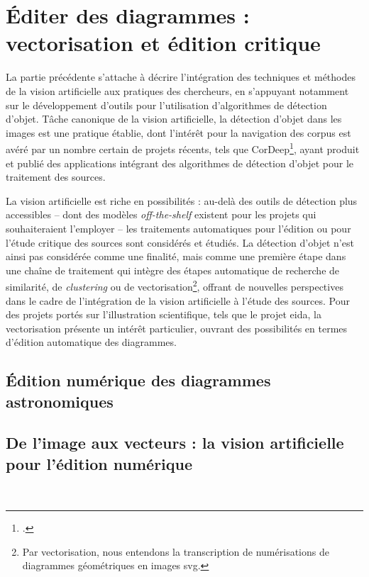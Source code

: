 \documentclass[a4paper,12pt,twoside]{book}
\newcommand{\eida}{\gls{eida}\xspace}
\newcommand{\svg}{\gls{svg}\xspace}
\begin{document}
        \chapter[Éditer des diagrammes]{Éditer des diagrammes : vectorisation et édition critique}
        La partie précédente s'attache à décrire l'intégration des techniques et méthodes de la vision artificielle aux pratiques des chercheurs, en s'appuyant notamment sur le développement d'outils pour l'utilisation d'algorithmes de détection d'objet. Tâche canonique de la vision artificielle, la détection d'objet dans les images est une pratique établie, dont l'intérêt pour la navigation des corpus est avéré par un nombre certain de projets récents, tels que CorDeep\footcite{CorDeep}, ayant produit et publié des applications intégrant des algorithmes de détection d'objet pour le traitement des sources.
        
        La vision artificielle est riche en possibilités : au-delà des outils de détection plus accessibles -- dont des modèles \textit{off-the-shelf} existent pour les projets qui souhaiteraient l'employer -- les traitements automatiques pour l'édition ou pour l'étude critique des sources sont considérés et étudiés. La détection d'objet n'est ainsi pas considérée comme une finalité, mais comme une première étape dans une chaîne de traitement qui intègre des étapes automatique de recherche de similarité, de \textit{clustering} ou de vectorisation\footnote{Par vectorisation, nous entendons la transcription de numérisations de diagrammes géométriques en images \svg.}, offrant de nouvelles perspectives dans le cadre de l'intégration de la vision artificielle à l'étude des sources. Pour des projets portés sur l'illustration scientifique, tels que le projet \eida, la vectorisation présente un intérêt particulier, ouvrant des possibilités en termes d'édition automatique des diagrammes.
        
                \section{Édition numérique des diagrammes astronomiques}
                    
            
                \section[De l’image aux vecteurs]{\label{vectorEdition}De l’image aux vecteurs : la vision artificielle pour l’édition numérique}
                    
        \\
        
\end{document}
